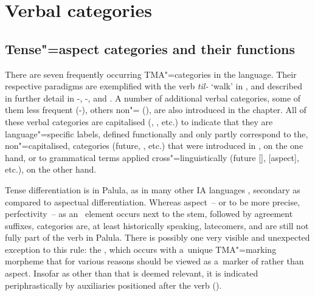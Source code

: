 \chapter{Verbal categories}
\label{chap:9}

\section{Tense"=aspect categories and their functions}
\label{sec:9-1}


There are seven frequently occurring TMA"=categories in the language. Their respective paradigms are exemplified with the verb \textit{til-} `walk' in , and described in further detail in -, -, and . A number of additional verbal categories, some of them less frequent (-), others non"= (), are also introduced in the chapter. All of these verbal categories are capitalised (, , etc.) to indicate that they are language"=specific labels, defined functionally and only partly correspond to the, non"=capitalised,  categories (future, , etc.) that were introduced in , on the one hand, or to grammatical terms applied cross"=linguistically (future [],  [aspect], etc.), on the other hand.  


Tense differentiation is in Palula, as in many other IA languages \citep[262]{masica1991}, secondary as compared to aspectual differentiation. Whereas aspect~-- or to be more precise, perfectivity~-- as an~ element occurs next to the stem, followed by agreement suffixes,  categories are, at least historically speaking, latecomers, and are still not fully part of the verb in Palula. There is possibly one very visible and unexpected exception to this rule: the , which occurs with a~unique TMA"=marking morpheme that for various reasons should be viewed as a~marker of  rather than aspect. Insofar as  other than that is deemed relevant, it is indicated periphrastically by auxiliaries positioned after the  verb (). 


